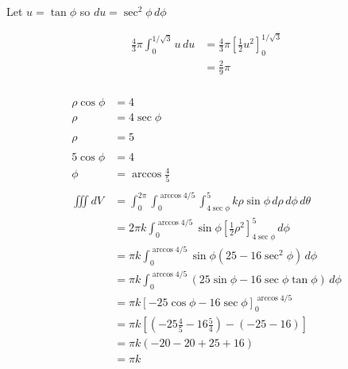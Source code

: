 \documentclass{article}
\begin{document}
Let $u = \tan \phi$ so $du = \sec^2 \phi \,d\phi$

\begin{align*}
  \frac{4}{3} \pi \int_0^{1 / \sqrt{3}} u \,du & = \frac{4}{3} \pi \left[ \frac{1}{2} u^2 \right]_0^{1 / \sqrt{3}} \\
                                               & = \frac{2}{9} \pi
\end{align*}

\setcounter{subsubsection}{80}
\subsubsection{}

\begin{align*}
  \rho \cos \phi & = 4                                                                                                     \\
  \rho           & = 4 \sec \phi                                                                                           \\ \\
  \rho           & = 5                                                                                                     \\ \\
  5 \cos \phi    & = 4                                                                                                     \\
  \phi           & = \arccos \frac{4}{5}                                                                                   \\ \\
  \iiint dV      & = \int_0^{2 \pi} \int_0^{\arccos 4 / 5} \int_{4 \sec \phi}^5 k \rho \sin \phi \,d\rho \,d\phi \,d\theta \\
                 & = 2 \pi k \int_0^{\arccos 4 / 5} \sin \phi \left[ \frac{1}{2} \rho^2 \right]_{4 \sec \phi}^5 \,d\phi    \\
                 & = \pi k \int_0^{\arccos 4 / 5} \sin \phi (25 - 16 \sec^2 \phi) \,d\phi                                  \\
                 & = \pi k \int_0^{\arccos 4 / 5} (25 \sin \phi - 16 \sec \phi \tan \phi) \,d\phi                          \\
                 & = \pi k [-25 \cos \phi - 16 \sec \phi]_0^{\arccos 4 / 5}                                                \\
                 & = \pi k \left[ \left( -25 \frac{4}{5} - 16 \frac{5}{4} \right) - (-25 - 16) \right]                     \\
                 & = \pi k \left( -20 - 20 + 25 + 16 \right)                                                               \\
                 & = \pi k
\end{align*}
\end{document}

